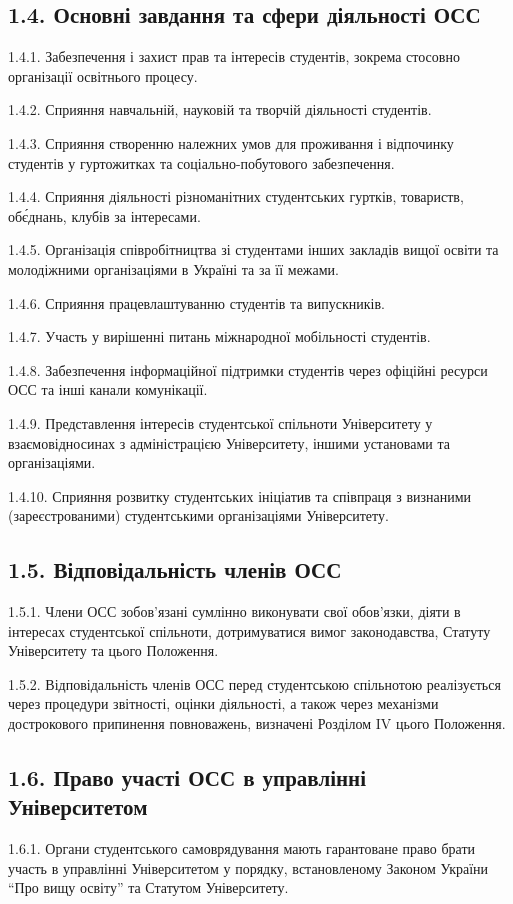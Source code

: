 \subsection*{1.4. Основні завдання та сфери діяльності ОСС}
    1.4.1. Забезпечення і захист прав та інтересів студентів, зокрема стосовно організації освітнього процесу.

    1.4.2. Сприяння навчальній, науковій та творчій діяльності студентів.

    1.4.3. Сприяння створенню належних умов для проживання і відпочинку студентів у гуртожитках та соціально-побутового забезпечення.

    1.4.4. Сприяння діяльності різноманітних студентських гуртків, товариств, об\'єднань, клубів за інтересами.

    1.4.5. Організація співробітництва зі студентами інших закладів вищої освіти та молодіжними організаціями в Україні та за її межами.

    1.4.6. Сприяння працевлаштуванню студентів та випускників.

    1.4.7. Участь у вирішенні питань міжнародної мобільності студентів.

    1.4.8. Забезпечення інформаційної підтримки студентів через офіційні ресурси ОСС та інші канали комунікації.

    1.4.9. Представлення інтересів студентської спільноти Університету у взаємовідносинах з адміністрацією Університету, іншими установами та організаціями.

    1.4.10. Сприяння розвитку студентських ініціатив та співпраця з визнаними (зареєстрованими) студентськими організаціями Університету.

\subsection*{1.5. Відповідальність членів ОСС}
    1.5.1. Члени ОСС зобов'язані сумлінно виконувати свої обов'язки, діяти в інтересах студентської спільноти, дотримуватися вимог законодавства, Статуту Університету та цього Положення.

    1.5.2. Відповідальність членів ОСС перед студентською спільнотою реалізується через процедури звітності, оцінки діяльності, а також через механізми дострокового припинення повноважень, визначені Розділом IV цього Положення.

\subsection*{1.6. Право участі ОСС в управлінні Університетом}
    1.6.1. Органи студентського самоврядування мають гарантоване право брати участь в управлінні Університетом у порядку, встановленому Законом України ``Про вищу освіту'' та Статутом Університету.

